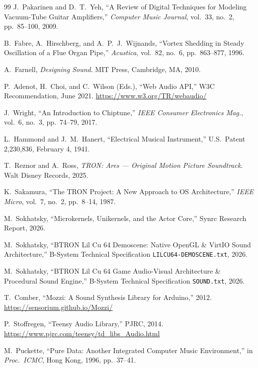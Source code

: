 \documentclass[10pt,journal,compsoc,twocolumn]{article}
\begin{document}
\begin{thebibliography}{99}
J.~Pakarinen and D.~T.~Yeh,
``A Review of Digital Techniques for Modeling Vacuum-Tube Guitar Amplifiers,''
\emph{Computer Music Journal}, vol.~33, no.~2, pp.~85--100, 2009.

B.~Fabre, A.~Hirschberg, and A.~P.~J.~Wijnands,
``Vortex Shedding in Steady Oscillation of a Flue Organ Pipe,''
\emph{Acustica}, vol.~82, no.~6, pp.~863--877, 1996.

A.~Farnell,
\emph{Designing Sound}.
MIT Press, Cambridge, MA, 2010.

P.~Adenot, H.~Choi, and C.~Wilson (Eds.),
``Web Audio API,'' W3C Recommendation, June 2021.
\url{https://www.w3.org/TR/webaudio/}

J.~Wright,
``An Introduction to Chiptune,''
\emph{IEEE Consumer Electronics Mag.}, vol.~6, no.~3, pp.~74--79, 2017.

L.~Hammond and J.~M.~Hanert,
``Electrical Musical Instrument,''
U.S.\ Patent 2,230,836, February 4, 1941.

T.~Reznor and A.~Ross,
\emph{TRON: Ares --- Original Motion Picture Soundtrack}.
Walt Disney Records, 2025.

K.~Sakamura,
``The TRON Project: A New Approach to OS Architecture,''
\emph{IEEE Micro}, vol.~7, no.~2, pp.~8--14, 1987.

M.~Sokhatsky,
``Microkernels, Unikernels, and the Actor Core,''
Synrc Research Report, 2026.

M.~Sokhatsky,
``BTRON Lil Cu 64 Demoscene: Native OpenGL \& VirtIO Sound Architecture,''
B-System Technical Specification \texttt{LILCU64-DEMOSCENE.txt}, 2026.

M.~Sokhatsky,
``BTRON Lil Cu 64 Game Audio-Visual Architecture \& Procedural Sound Engine,''
B-System Technical Specification \texttt{SOUND.txt}, 2026.

T.~Comber,
``Mozzi: A Sound Synthesis Library for Arduino,'' 2012.
\url{https://sensorium.github.io/Mozzi/}

P.~Stoffregen,
``Teensy Audio Library,'' PJRC, 2014.
\url{https://www.pjrc.com/teensy/td_libs_Audio.html}

M.~Puckette,
``Pure Data: Another Integrated Computer Music Environment,'' in
\emph{Proc.\ ICMC}, Hong Kong, 1996, pp.~37--41.


\end{thebibliography}
\end{document}
